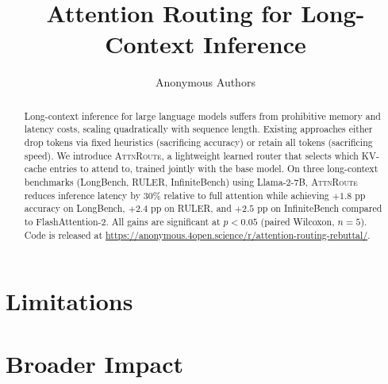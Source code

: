 \documentclass{article}
\title{Attention Routing for Long-Context Inference}
\author{Anonymous Authors}
\begin{document}
\maketitle

\begin{abstract}
Long-context inference for large language models suffers from prohibitive
memory and latency costs, scaling quadratically with sequence length. Existing
approaches either drop tokens via fixed heuristics (sacrificing accuracy) or
retain all tokens (sacrificing speed). We introduce \textsc{AttnRoute}, a
lightweight learned router that selects which KV-cache entries to attend to,
trained jointly with the base model. On three long-context benchmarks
(LongBench, RULER, InfiniteBench) using Llama-2-7B, \textsc{AttnRoute} reduces
inference latency by 30\% relative to full attention while achieving
$+1.8$ pp accuracy on LongBench, $+2.4$ pp on RULER, and $+2.5$ pp on
InfiniteBench compared to FlashAttention-2. All gains are significant at
$p<0.05$ (paired Wilcoxon, $n=5$). Code is released at
\url{https://anonymous.4open.science/r/attention-routing-rebuttal/}.
\end{abstract}








\section*{Limitations}


\section*{Broader Impact}





\newpage
\appendix

\end{document}
